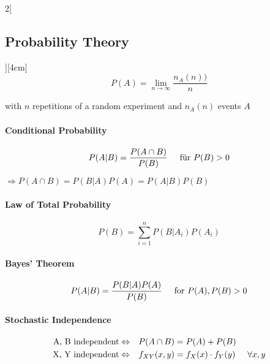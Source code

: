 \documentclass[8pt]{extarticle}
\begin{document}
\begin{multicols}{2}[\subsection{Probability Theory}][4cm]
$$P(A) = \lim\limits_{n \to \infty}\frac{n_A(n))}{n}$$

\noindent with $n$ repetitions of a random experiment and $n_A(n)$ events $A$

\paragraph{Conditional Probability}

$$P(A|B)=\frac{P(A \cap B)}{P(B)} \hspace{0.5cm} \text{für } P(B) > 0$$


$ \Rightarrow P(A \cap B)=P(B|A)P(A)=P(A|B)P(B)$

\paragraph{Law of Total Probability}

$$P(B)=\sum\limits_{i=1}^nP(B|A_i)P(A_i)$$

\paragraph{Bayes' Theorem}

$$P(A|B)=\frac{P(B|A)P(A)}{P(B)} \hspace{0.5cm} \text{for } P(A), P(B) > 0$$

\paragraph{Stochastic Independence}

\begin{alignat*}{2}
 \text{A, B independent}  \Leftrightarrow  && P(A\cap B) &= P(A)+P(B) \\
 \text{X, Y independent}  \Leftrightarrow && f_{XY}(x,y) &= f_X(x)\cdot f_Y(y) \hspace{0.5cm} \forall x,y
\end{alignat*}

\end{multicols}
\end{document}
